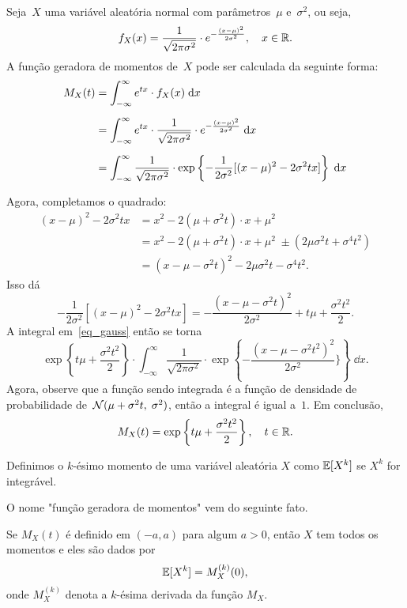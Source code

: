 \begin{example}
[Normal]
Seja~$X$ uma variável aleatória normal com parâmetros~$\mu$ e~$\sigma^2$, ou seja,
\[f_X(x) = \frac{1}{\sqrt{2\pi \sigma^2}} \cdot e ^{-\frac{(x-\mu)^2}{2\sigma^2}},\quad x \in \mathbb{R}.\]
A função geradora de momentos de~$X$ pode ser calculada da seguinte forma:
\begin{align}
 \nonumber M_X(t)&= \int_{-\infty}^\infty e ^{tx}\cdot f_X(x)\;\mathrm{d} x\\[.2cm]
\nonumber &= \int_{-\infty}^\infty e ^{tx}\cdot \frac{1}{\sqrt{2\pi\sigma^2}} \cdot e ^{-\frac{(x-\mu)^2}{2\sigma^2}}\;\mathrm{d} x\\[.2cm]
 &= \int_{-\infty}^\infty \frac{1}{\sqrt{2\pi\sigma^2}} \cdot \exp\left\{-\frac{1}{2\sigma^2}[(x-\mu)^2 - 2\sigma^2 t x]\right\}\;\mathrm{d} x \label{eq_gauss}
 \end{align}

Agora, completamos o quadrado:
\begin{align*}
 (x-\mu)^2 - 2\sigma^2 t x &= x^2 - 2(\mu +\sigma^2 t)\cdot x + \mu^2 \\[.2cm]
 &= x^2 - 2(\mu +\sigma^2 t)\cdot x +\mu^2 \;\pm (2\mu \sigma^2 t+ \sigma^4t^2 )\\[.2cm]
 &= (x-\mu-\sigma^2 t)^2 - 2\mu \sigma^2 t- \sigma^4t^2 .
\end{align*}
Isso dá
\[-\frac{1}{2\sigma^2}[(x-\mu)^2 - 2\sigma^2 t x] = -\frac{(x-\mu-\sigma^2 t)^2}{2\sigma^2} +t\mu+ \frac{\sigma^2t^2}{2}.\]
A integral em~\eqref{eq_gauss} então se torna
\[\exp\left\{t\mu + \frac{\sigma^2t^2}{2}\right\}\cdot \int_{-\infty}^\infty \frac{1}{\sqrt{2\pi\sigma^2}} \cdot \exp\left\{-\frac{(x-\mu-\sigma^2t^2)^2}{2\sigma^2}\}\right\} \;\dd x.\]
Agora, observe que a função sendo integrada é a função de densidade de probabilidade de~$\mathcal{N} (\mu+\sigma^2 t,\;\sigma^2)$, então a integral é igual a~$1$. Em conclusão,
\[M_X(t) = \exp\left\{t\mu + \frac{\sigma^2 t^2}{2}\right\},\quad t \in \mathbb{R}.\]
\end{example}

\begin{definition}
[Momentos]
Definimos o $ k $-ésimo momento de uma variável aleatória $ X $ como $ \mathbb{E}[X^k] $ se $ X^k $ for integrável.
\end{definition}

O nome "função geradora de momentos" vem do seguinte fato.
\begin{proposition}
Se $ M_X(t) $ é definido em $ (-a,a) $ para algum $ a>0 $, então $ X $ tem todos os momentos e eles são dados por
\[
\mathbb{E}[X^k]
=
M_X^{(k)}(0)
,
\]
onde $ M_X^{(k)} $ denota a $ k $-ésima derivada da função $ M_X $.
\end{proposition}

